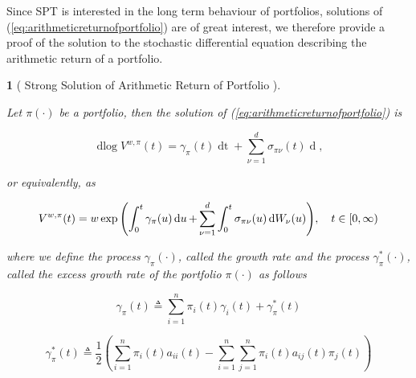 \documentclass[british]{amsart} \usepackage{lmodern}
\numberwithin{equation}{section} \numberwithin{figure}{section}
\theoremstyle{plain} \newtheorem{thm}{\protect\theoremname}[section]
\theoremstyle{definition} \newtheorem{defn}[thm]{\protect\definitionname}
\theoremstyle{plain} \newtheorem{assumption}[thm]{\protect\assumptionname}
\theoremstyle{plain} \newtheorem{lem}[thm]{\protect\lemmaname}
\theoremstyle{plain} \newtheorem{prop}[thm]{\protect\propositionname}
\theoremstyle{remark} \newtheorem{rem}[thm]{\protect\remarkname}
\theoremstyle{plain} \newtheorem{cor}[thm]{\protect\corollaryname}
\renewcommand{\d}[1]{\mathop{\mathrm{d}{#1}}}
\newcommand{\defeq}{\mathop{\triangleq}} \newcommand{\almostsurely}{\text{a.s.}}
\newcommand{\V}{V^{w,\pi}}
\begin{document}
Since SPT is interested in the long term behaviour of portfolios, solutions of
(\ref{eq:arithmeticreturnofportfolio}) are of great interest, we therefore
provide a proof of the solution to the stochastic differential equation
describing the arithmetic return of a portfolio. 

\begin{prop} 
  [
    {\cite[Equation 1.10]{fernholz2009}} 
    Strong Solution of Arithmetic Return of Portfolio
  ]
  \label{prop:solutionofarithmeticreturnofportfolio}

  Let $\pi(\cdot)$ be a portfolio, then the solution of
  (\ref{eq:arithmeticreturnofportfolio}) is

  \begin{equation}
    \label{eq:solutionofarithmeticreturnofportfoliodiff}
    \d\log{\V(t)} =  
        \gamma_{\pi}(t) \d{t} +
        \sum_{\nu=1}^{d} \sigma_{\pi\nu}(t) \d{W_{\nu}(t)} ,
  \end{equation}

  or equivalently, as

  \begin{equation}
    \label{eq:solutionofarithmeticreturnofportfolio}
    \V(t) = w \exp{ 
      \left(
        \int_{0}^{t} \gamma_{\pi}(u) \d{u} +
        \sum_{\nu=1}^{d} \int_{0}^{t} \sigma_{\pi\nu}(u) \d{W_{\nu}(u)}
      \right)},
  \quad \ranget
  \end{equation}

  where we define the process $\gamma_{\pi}(\cdot)$, called the \textit{growth
  rate} and the process $\gamma_{\pi}^{*}(\cdot)$, called the \textit{excess
  growth rate} of the portfolio $\pi(\cdot)$ as follows

  \begin{equation}
    \label{eq:portfoliogrowthrate}
    \gamma_{\pi}(t) \defeq 
      \sum_{i=1}^{n} \pi_{i}(t)\gamma_{i}(t) + 
      \gamma_{\pi}^{*}(t)
  \end{equation}

  \begin{equation}
    \label{eq:portfolioexcessgrowthrate}
    \gamma_{\pi}^{*}(t) \defeq \frac{1}{2} 
        \left(
          \sum_{i=1}^{n} \pi_{i}(t)a_{ii}(t) -
          \sum_{i=1}^{n} \sum_{j=1}^{n} \pi_{i}(t)a_{ij}(t)\pi_{j}(t)
        \right)
  \end{equation}

\end{prop}
\newcommand{\Valpha}{\V(t)b_{\pi}(t)}
\newcommand{\Vbeta}{\V(t)\sigma_{\pi\nu}(t)}
\newcommand{\VFt}{0}
\newcommand{\VFx}{\frac{1}{\V(t)}}
\end{document}
